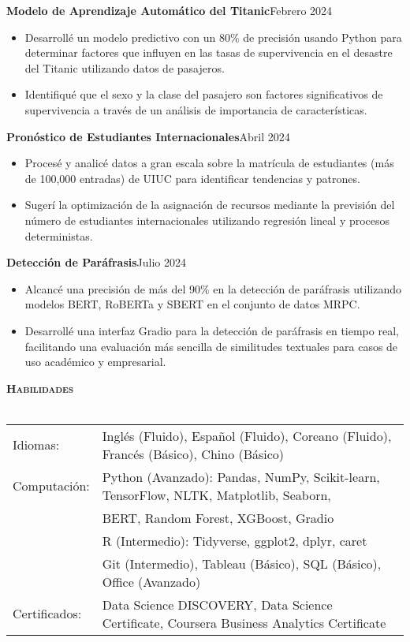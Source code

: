 \documentclass[a4paper]{article}
\newcommand{\lineunder} {
    \vspace*{-8pt} \\
    \hspace*{-18pt} \hrulefill \\
}
\newcommand{\header} [1] {
    {\hspace*{-18pt}\vspace*{6pt} \textsc{#1}}
    \vspace*{-6pt} \lineunder
}
\begin{document}
\textbf{Modelo de Aprendizaje Automático del Titanic}\hfill{Febrero 2024}\\
\begin{itemize}[nolistsep]
    \item Desarrollé un modelo predictivo con un 80\% de precisión usando Python para determinar factores que influyen en las tasas de supervivencia en el desastre del Titanic utilizando datos de pasajeros.
    \item Identifiqué que el sexo y la clase del pasajero son factores significativos de supervivencia a través de un análisis de importancia de características.
\end{itemize}

\textbf{Pronóstico de Estudiantes Internacionales}\hfill{Abril 2024}\\
\begin{itemize}[nolistsep]
    \item Procesé y analicé datos a gran escala sobre la matrícula de estudiantes (más de 100,000 entradas) de UIUC para identificar tendencias y patrones.
    \item Sugerí la optimización de la asignación de recursos mediante la previsión del número de estudiantes internacionales utilizando regresión lineal y procesos deterministas.
\end{itemize}

\textbf{Detección de Paráfrasis}\hfill{Julio 2024}\\
\begin{itemize}[nolistsep]
    \item Alcancé una precisión de más del 90\% en la detección de paráfrasis utilizando modelos BERT, RoBERTa y SBERT en el conjunto de datos MRPC.
    \item Desarrollé una interfaz Gradio para la detección de paráfrasis en tiempo real, facilitando una evaluación más sencilla de similitudes textuales para casos de uso académico y empresarial.
\end{itemize}

\vspace*{1mm}


\header{\textbf{Habilidades}}
\begin{tabular}{ l l }
    Idiomas: & Inglés (Fluido), Español (Fluido), Coreano (Fluido), Francés (Básico), Chino (Básico)              \\
    Computación: & Python (Avanzado): Pandas, NumPy, Scikit-learn, TensorFlow, 
    NLTK, Matplotlib, Seaborn, \\
    & BERT, Random Forest, XGBoost, Gradio\\
    & R (Intermedio): Tidyverse, ggplot2, dplyr, caret\\
    & Git (Intermedio), Tableau (Básico), SQL (Básico), Office (Avanzado)\\
    Certificados: & Data Science DISCOVERY, Data Science Certificate, 
    Coursera Business Analytics Certificate
\end{tabular}
\end{document}
